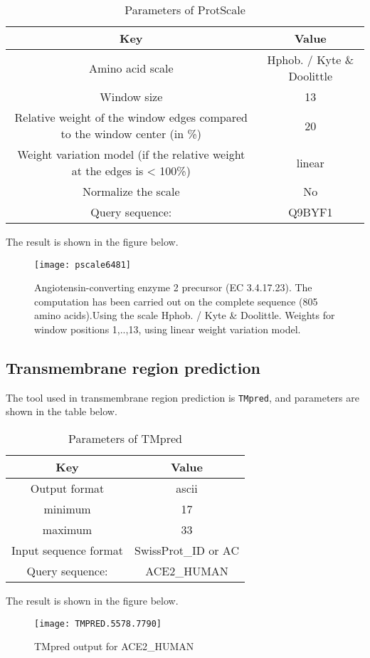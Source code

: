 \documentclass[en,black,10pt,normal]{elegantnote}
\newcommand{\upcite}[1]{\textsuperscript{\textsuperscript{\cite{#1}}}}
\begin{document}
\begin{table}[H]
    \caption{Parameters of ProtScale}
    \centering
    \begin{tabular}{cc}
        \toprule
        Key&Value\\
        \midrule
        Amino acid scale&Hphob. / Kyte \& Doolittle\upcite{kyte1982simple} \\
        Window size&13\\
        Relative weight of the window edges compared to the window center (in \%)&20\\
        Weight variation model (if the relative weight at the edges is < 100\%)&linear\\
        Normalize the scale&No\\
        Query sequence:&Q9BYF1\\
        \bottomrule
    \end{tabular}
\end{table}
The result is shown in the figure below.
\begin{figure}[H]
    \centering
    \texttt{[image: pscale6481]}
    \caption{Angiotensin-converting enzyme 2 precursor (EC 3.4.17.23). The computation has been carried out on the complete sequence (805 amino acids).Using the scale Hphob. / Kyte \& Doolittle\upcite{kyte1982simple}. Weights for window positions 1,..,13, using linear weight variation model.}
    \label{F-01}
\end{figure}

\subsection{Transmembrane region prediction}

The tool used in transmembrane region prediction is \texttt{TMpred}\upcite{hofmann1993tmbase}, 
and parameters are shown in the table below.

\begin{table}[H]
    \caption{Parameters of TMpred}
    \centering
    \begin{tabular}{cc}
        \toprule
        Key&Value\\
        \midrule
        Output format&ascii\\
        minimum&17\\
        maximum&33\\
        Input sequence format&SwissProt\_ID or AC\\
        Query sequence:&ACE2\_HUMAN\\
        \bottomrule
    \end{tabular}
\end{table}
The result is shown in the figure below.
\begin{figure}[H]
    \centering
    \texttt{[image: TMPRED.5578.7790]}
    \caption{TMpred output for ACE2\_HUMAN}
    \label{F-02}
\end{figure}
\end{document}
